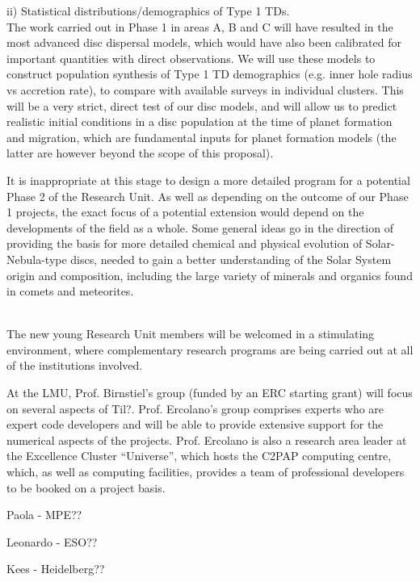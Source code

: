\documentclass[12pt]{article}
\begin{document}
ii) Statistical distributions/demographics of Type 1 TDs. \\
The work carried out in Phase 1 in areas A, B and C will have resulted
in the most advanced disc dispersal models, which would have also been
calibrated for important quantities with direct observations. We will
use these models to construct population synthesis of Type 1
TD demographics (e.g. inner hole radius vs accretion
rate), to compare with available surveys in individual clusters.  
This will be a very strict, direct test of our disc models, and will
allow us to predict realistic initial conditions in a disc population at the
time of planet formation and migration, which are fundamental inputs
for planet formation models (the latter are however beyond the scope of this
proposal).  

It is inappropriate at this stage to design a more detailed program
for a potential Phase 2 of the Research Unit. As well as depending on
the outcome of our Phase 1 projects, the exact focus of a potential
extension would depend on the developments of the field as a
whole. Some general ideas go in the direction of providing the basis for more detailed chemical
and physical evolution of Solar-Nebula-type discs, needed to gain a
better understanding of the Solar System origin and composition,
including the large variety of minerals and organics found in comets
and meteorites. 
\vspace{0.8em}

\\

The new young Research Unit members will be welcomed in a stimulating
environment, where complementary research programs are being carried
out at all of the institutions involved. 

At the LMU, Prof. Birnstiel's group (funded by an ERC starting grant)
will focus on several aspects of {\color{red} Til?}. 
Prof. Ercolano's group comprises experts who are expert code developers and will be
able to provide extensive support for the numerical aspects of the
projects. Prof. Ercolano is also a research area leader at the
Excellence Cluster ``Universe'', which hosts the C2PAP computing
centre, which, as well as computing facilities, provides a team of
professional developers to be booked on a project basis. 

{\color{red} Paola - MPE??}

{\color{red} Leonardo - ESO??}

{\color{red} Kees - Heidelberg??}
\end{document}
